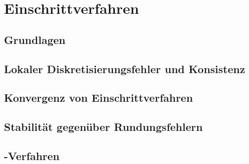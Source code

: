 \section{Einschrittverfahren}

\subsection{Grundlagen}

\subsection{Lokaler Diskretisierungsfehler und Konsistenz}

\subsection{Konvergenz von Einschrittverfahren}

\subsection{Stabilität gegenüber Rundungsfehlern}

\subsection{-Verfahren}
